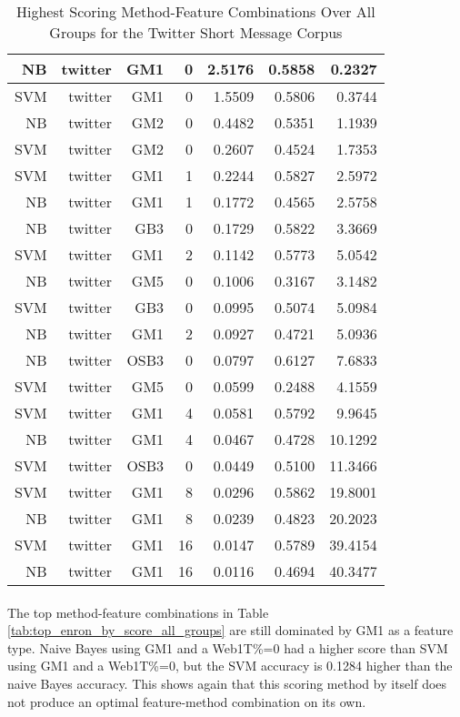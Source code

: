 \begin{table}[htbp!]
\begin{center}
\begin{tabular}{ | r | r | r | r | r | r | r | }
		NB & twitter & GM1 & 0 & 2.5176 & 0.5858 & 0.2327\\ \hline 
		SVM & twitter & GM1 & 0 & 1.5509 & 0.5806 & 0.3744\\ \hline 
		NB & twitter & GM2 & 0 & 0.4482 & 0.5351 & 1.1939\\ \hline 
		SVM & twitter & GM2 & 0 & 0.2607 & 0.4524 & 1.7353\\ \hline 
		SVM & twitter & GM1 & 1 & 0.2244 & 0.5827 & 2.5972\\ \hline 
		NB & twitter & GM1 & 1 & 0.1772 & 0.4565 & 2.5758\\ \hline 
		NB & twitter & GB3 & 0 & 0.1729 & 0.5822 & 3.3669\\ \hline 
		SVM & twitter & GM1 & 2 & 0.1142 & 0.5773 & 5.0542\\ \hline 
		NB & twitter & GM5 & 0 & 0.1006 & 0.3167 & 3.1482\\ \hline 
		SVM & twitter & GB3 & 0 & 0.0995 & 0.5074 & 5.0984\\ \hline 
		NB & twitter & GM1 & 2 & 0.0927 & 0.4721 & 5.0936\\ \hline 
		NB & twitter & OSB3 & 0 & 0.0797 & 0.6127 & 7.6833\\ \hline 
		SVM & twitter & GM5 & 0 & 0.0599 & 0.2488 & 4.1559\\ \hline 
		SVM & twitter & GM1 & 4 & 0.0581 & 0.5792 & 9.9645\\ \hline 
		NB & twitter & GM1 & 4 & 0.0467 & 0.4728 & 10.1292\\ \hline 
		SVM & twitter & OSB3 & 0 & 0.0449 & 0.5100 & 11.3466\\ \hline 
		SVM & twitter & GM1 & 8 & 0.0296 & 0.5862 & 19.8001\\ \hline 
		NB & twitter & GM1 & 8 & 0.0239 & 0.4823 & 20.2023\\ \hline 
		SVM & twitter & GM1 & 16 & 0.0147 & 0.5789 & 39.4154\\ \hline 
		NB & twitter & GM1 & 16 & 0.0116 & 0.4694 & 40.3477\\ \hline 
		\end{tabular}
		\caption{Highest Scoring Method-Feature Combinations Over All Groups for the Twitter Short Message Corpus}
		\label{tab:top_twitter_by_score_all_groups}
	\end{center}
\end{table}

\paragraph*{} The top method-feature combinations in Table \ref{tab:top_enron_by_score_all_groups} are still dominated by GM1 as a feature type.  Naive Bayes using GM1 and a Web1T\%=0 had a higher score than SVM using GM1 and a Web1T\%=0, but the SVM accuracy is 0.1284 higher than the naive Bayes accuracy.  This shows again that this scoring method by itself does not produce an optimal feature-method combination on its own.

